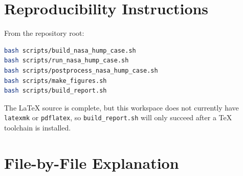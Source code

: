 \documentclass[11pt]{article}
\begin{document}
\section{Reproducibility Instructions}
From the repository root:
\begin{lstlisting}[language=bash]
bash scripts/build_nasa_hump_case.sh
bash scripts/run_nasa_hump_case.sh
bash scripts/postprocess_nasa_hump_case.sh
bash scripts/make_figures.sh
bash scripts/build_report.sh
\end{lstlisting}

The LaTeX source is complete, but this workspace does not currently have \texttt{latexmk} or \texttt{pdflatex}, so \texttt{build\_report.sh} will only succeed after a TeX toolchain is installed.

\section{File-by-File Explanation}
\end{document}
